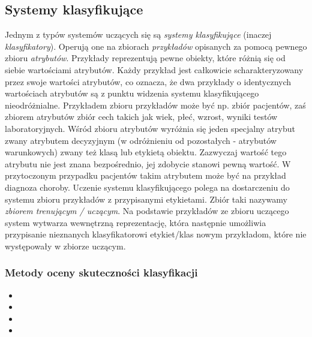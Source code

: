 \subsection{Systemy klasyfikujące}
Jednym z typów systemów uczących się są \emph{systemy klasyfikujące} (inaczej \emph{klasyfikatory}). Operują one na zbiorach \emph{przykładów} opisanych za pomocą pewnego zbioru \emph{atrybutów}.
Przykłady reprezentują pewne obiekty, które różnią się od siebie wartościami atrybutów. Każdy przykład jest całkowicie scharakteryzowany przez swoje wartości atrybutów, co oznacza, że dwa przykłady o identycznych wartościach atrybutów są z punktu widzenia systemu klasyfikującego nieodróżnialne. Przykładem zbioru przykładów może być np. zbiór pacjentów, zaś zbiorem atrybutów zbiór cech takich jak wiek, płeć, wzrost, wyniki testów laboratoryjnych.
Wśród zbioru atrybutów wyróżnia się jeden specjalny atrybut zwany atrybutem decyzyjnym (w odróżnieniu od pozostałych - atrybutów warunkowych) zwany też klasą lub etykietą obiektu.
Zazwyczaj wartość tego atrybutu nie jest znana bezpośrednio, jej zdobycie stanowi pewną wartość. W przytoczonym przypadku pacjentów takim atrybutem może być na przykład diagnoza choroby.
Uczenie systemu klasyfikującego polega na dostarczeniu do systemu zbioru przykładów z przypisanymi etykietami. Zbiór taki nazywamy \emph{zbiorem trenującym / uczącym}. Na podstawie przykładów ze zbioru uczącego system wytwarza wewnętrzną reprezentację, która następnie umożliwia przypisanie nieznanych klasyfikatorowi etykiet/klas nowym przykładom, które nie występowały w zbiorze uczącym.

\subsubsection{Metody oceny skuteczności klasyfikacji}



\begin{itemize}
\item {}
\item {}
\item {}
\item {}

\end{itemize}

